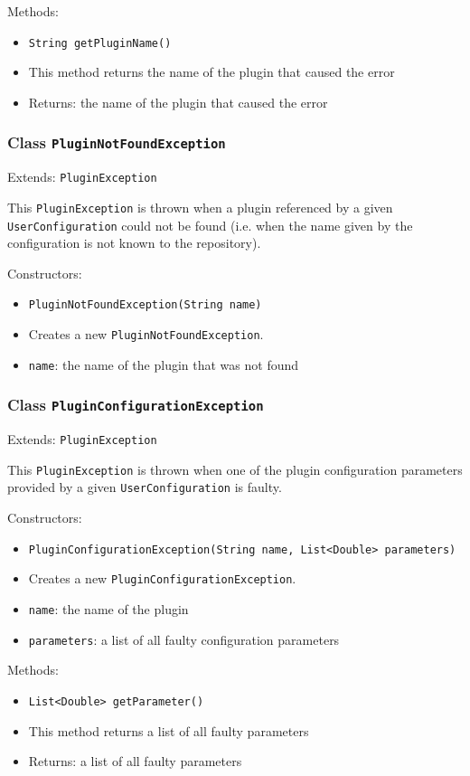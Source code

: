 \documentclass[parskip=full,11pt]{scrartcl}
\begin{document}
Methods:
\begin{itemize} \itemsep -10pt
	\item \texttt{String getPluginName()}
	\item[] This method returns the name of the plugin that caused the error
	\item[] Returns: the name of the plugin that caused the error
\end{itemize}

\subsubsection{Class \texttt{PluginNotFoundException}}
Extends: \texttt{PluginException}

This \texttt{PluginException} is thrown when a plugin referenced by a given \texttt{UserConfiguration} could not be found (i.e. when the name given by the configuration is not known to the repository).

Constructors:
\begin{itemize} \itemsep -10pt
	\item \texttt{PluginNotFoundException(String name)}
	\item[] Creates a new \texttt{PluginNotFoundException}.
	\item[] \texttt{name}: the name of the plugin that was not found
\end{itemize}

\subsubsection{Class \texttt{PluginConfigurationException}}
Extends: \texttt{PluginException}

This \texttt{PluginException} is thrown when one of the plugin configuration parameters provided by a given \texttt{UserConfiguration} is faulty.

Constructors:
\begin{itemize}\itemsep -10pt
	\item \texttt{PluginConfigurationException(String name, List<Double> parameters)}
	\item[] Creates a new \texttt{PluginConfigurationException}.
	\item[] \texttt{name}: the name of the plugin
	\item[] \texttt{parameters}: a list of all faulty configuration parameters
\end{itemize}

Methods:
\begin{itemize}\itemsep -10pt
	\item \texttt{List<Double> getParameter()}
	\item[] This method returns a list of all faulty parameters
	\item[] Returns: a list of all faulty parameters
\end{itemize}
\end{document}
